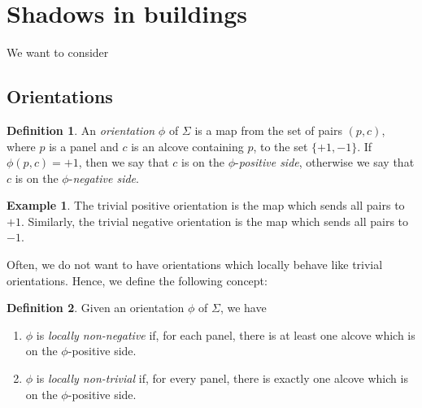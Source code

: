 \documentclass[11pt]{article}
\begin{document}
\newtheorem{theorem}{Theorem}
\theoremstyle{definition}
\newtheorem{definition}{Definition}
\newtheorem{proposition}{Proposition}
\newtheorem{example}{Example}
\newtheorem{lemma}{Lemma}
\newtheorem{corollary}{Corollary}
\newcommand{\uw}{\mathcal{U}(W,X)}
\newcommand{\W}{$(W,S)$}
\newcommand{\ix}{\textit}
\newcommand{\tr}{\textcolor{red}}
\newcommand{\sg}{$\Sigma$}




\section{Shadows in buildings}

We want to consider 

\subsection{Orientations}

\begin{definition}\cite[?]{SHA}
    An \ix{orientation} $\phi$ of $\Sigma$ is a map from the set of pairs $(p,c)$, where $p$ is a panel and $c$ is an alcove containing $p$, to the set $\{+1,-1\}$. If $\phi (p,c)=+1$, then we say that $c$ is on the $\phi$-\ix{positive side}, otherwise we say that $c$ is on the $\phi$-\ix{negative side}. 
\end{definition}


\begin{example}
    The trivial positive orientation is the map which sends all pairs to $+1$. Similarly, the trivial negative orientation is the map which sends all pairs to $-1$. 
\end{example}

Often, we do not want to have orientations which locally behave like trivial orientations. Hence, we define the following concept:

\begin{definition}\cite[?]{SHA}
    Given an orientation $\phi$ of \sg, we have
    \begin{enumerate}
        \item $\phi$ is \ix{locally non-negative} if, for each panel, there is at least one alcove which is on the $\phi$-positive side.
        \item $\phi$ is \ix{locally non-trivial} if, for every panel, there is exactly one alcove which is on the $\phi$-positive side.
    \end{enumerate}
\end{definition}
\end{document}
